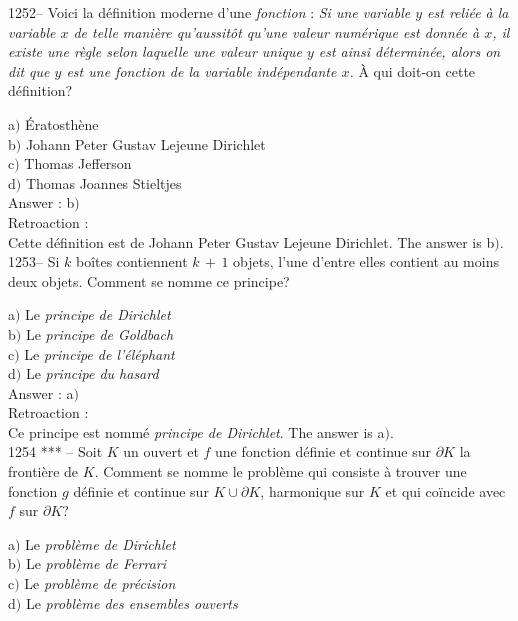 ﻿\documentclass[letterpaper, 12pt]{article}
\begin{document}
1252-- Voici la d\'efinition moderne d'une {\sl fonction} : {\sl Si
une variable $y$ est reli\'ee \`a la variable $x$ de telle mani\`ere
qu'aussit\^ot qu'une valeur num\'erique est donn\'ee \`a $x$, il
existe une r\`egle selon laquelle une valeur unique $y$ est ainsi
d\'etermin\'ee, alors on dit que $y$ est une fonction de la variable
ind\'ependante $x$.} \`A qui doit-on cette d\'efinition?

a$)$ \'Eratosth\`ene \\
b$)$ Johann Peter Gustav Lejeune Dirichlet \\
c$)$ Thomas Jefferson \\
d$)$ Thomas Joannes Stieltjes\\

Answer : b$)$\\

Retroaction : \\
Cette d\'efinition est de Johann Peter Gustav Lejeune Dirichlet.
The answer is b$)$.\\

1253-- Si $k$ bo\^ites contiennent $k\,+\,1$ objets, l'une d'entre
elles contient au moins deux objets. Comment se nomme ce principe?

a$)$ Le {\sl principe de Dirichlet} \\
b$)$ Le {\sl principe de Goldbach} \\
c$)$ Le {\sl principe de l'\'el\'ephant} \\
d$)$ Le {\sl principe du hasard}\\

Answer : a$)$\\

Retroaction : \\
Ce principe est nomm\'e {\sl principe de Dirichlet}.
The answer is a$)$.\\

1254 *** -- Soit $K$ un ouvert et $f$ une fonction d\'efinie et
continue sur $\partial K$  la fronti\`ere de $K$. Comment se nomme
le probl\`eme qui consiste \`a trouver une fonction $g$ d\'efinie et
continue sur $K\cup\partial K$, harmonique sur $K$ et qui co\"incide
avec $f$ sur $\partial K$?

a$)$ Le {\sl probl\`eme de Dirichlet} \\
b$)$ Le {\sl probl\`eme de Ferrari} \\
c$)$ Le {\sl probl\`eme de pr\'ecision} \\
d$)$ Le {\sl probl\`eme des ensembles ouverts}\\
\end{document}
